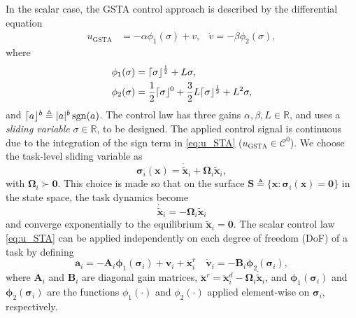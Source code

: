 \documentclass[../main.tex]{subfiles}
\begin{document}
In the scalar case, the GSTA control approach is described by the differential equation \citep{Moreno2009}
\begin{equation}
    \begin{aligned}
        \label{eq:u_STA}
        u_\mathrm{GSTA} &= -\alpha\phi_1(\sigma) + v,
        &\dot{v} = -\beta\phi_2(\sigma),
    \end{aligned}
\end{equation}
where
\begin{subequations}
    \begin{align}
        \phi_1 (\sigma) &= \lceil\sigma\rfloor^{\frac{1}{2}} + L \sigma, \\
        \phi_2 (\sigma) &= \frac{1}{2}\lceil\sigma\rfloor^0 + \frac{3}{2}L\lceil\sigma\rfloor^{\frac{1}{2}} + L^2\sigma,
    \end{align}
\end{subequations}
and $\lceil a\rfloor^b \triangleq |a|^b\operatorname{\mathrm{sgn}}(a)$. The control law has three gains $\alpha,\beta, L \in \mathbb{R}$, and uses a \emph{sliding variable} $\sigma \in \mathbb{R}$, to be designed. The applied control signal is continuous due to the integration of the sign term in \eqref{eq:u_STA} ($u_{\text{GSTA}} \in \mathcal{C}^0$). We choose the task-level sliding variable as
\begin{equation}
    \label{eq:sigma_def}
    \bm{\sigma}_i(\bm{x}) = \dot{\tilde{\bm{x}}}_i + \bm{\Omega}_{i}\tilde{\bm{x}}_i,
\end{equation}
with $\bm{\Omega}_i \succ \bm{0}$. This choice is made so that on the surface $\bm{S} \triangleq \{\bm{x} : \bm{\sigma}_i(\bm{x}) = \bm{0}\}$ in the state space, the task dynamics become
\begin{equation}
    \label{eq:task_dyamics_sliding}
    \dot{\tilde{\bm{x}}}_i = - \bm{\Omega}_i \tilde{\bm{x}}_i
\end{equation}
and converge exponentially to the equilibrium $\tilde{\bm{x}}_i = \bm{0}$. The scalar control law \eqref{eq:u_STA} can be applied independently on each degree of freedom (DoF) of a task by defining
\begin{equation}
    \label{eq:a_STA}
    \bm{a}_i = -\bm{A}_{i} \bm{\phi}_1(\bm{\sigma}_i) + \bm{v}_i + \ddot{\bm{x}}^r_i
    \quad \dot{\bm{v}}_i = -\bm{B}_{i}\bm{\phi}_2(\bm{\sigma}_i),
\end{equation}
where $\bm{A}_{i}$ and $\bm{B}_{i}$ are diagonal gain matrices, $\ddot{\bm{x}}^r = \ddot{\bm{x}}_i^d - \bm{\Omega}_i\dot{\tilde{\bm{x}}}_i$, and $\bm{\phi}_{1}(\bm{\sigma}_i)$ and $\bm{\phi}_{2}(\bm{\sigma}_i)$ are the functions $\phi_1(\cdot)$ and $\phi_2(\cdot)$ applied element-wise on $\bm{\sigma}_i$, respectively. %
\end{document}
